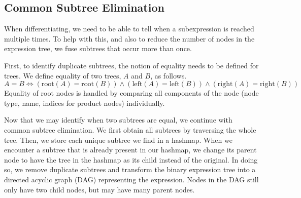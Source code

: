 \documentclass[12pt, a4paper]{report} %
\begin{document}
\subsection{Common Subtree Elimination}
When differentiating, we need to be able to tell when a subexpression is reached multiple times.
To help with this, and also to reduce the number of nodes in the expression tree, we fuse subtrees that occur more than once.

First, to identify duplicate subtrees, the notion of equality needs to be defined for trees.
We define equality of two trees, $A$ and $B$, as follows.
$$
A = B \iff (\text{root}(A) = \text{root}(B)) \land (\text{left}(A) = \text{left}(B)) \land (\text{right}(A) = \text{right}(B))
$$
Equality of root nodes is handled by comparing all components of the node (node type, name, indices for product nodes) individually.

Now that we may identify when two subtrees are equal, we continue with common subtree elimination.
We first obtain all subtrees by traversing the whole tree.
Then, we store each unique subtree we find in a hashmap.
When we encounter a subtree that is already present in our hashmap, we change its parent node to have the tree in the hashmap as its child instead of the original.
In doing so, we remove duplicate subtrees and transform the binary expression tree into a directed acyclic graph (DAG) representing the expression.
Nodes in the DAG still only have two child nodes, but may have many parent nodes.
\end{document}
